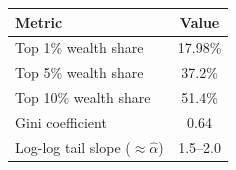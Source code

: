 \begin{tabular}{lc}
\toprule
Metric & Value \\
\midrule
Top 1\% wealth share & 17.98\% \\
Top 5\% wealth share & 37.2\% \\
Top 10\% wealth share & 51.4\% \\
Gini coefficient & 0.64 \\
Log-log tail slope ($\approx\hat\alpha$) & 1.5--2.0 \\
\bottomrule
\end{tabular}